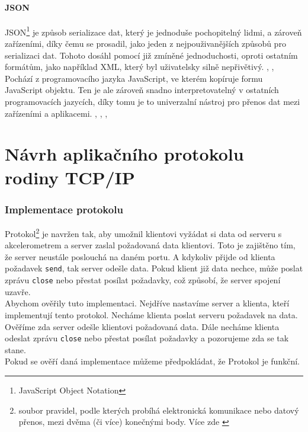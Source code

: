 \documentclass[12pt]{report}			%
\begin{document}
				\subsection{JSON}
				
				
JSON\footnote{JavaScript Object Notation} je způsob serializace dat, který je jednoduše pochopitelný lidmi, a zároveň zařízeními, díky čemu se prosadil, jako jeden z nejpouživanějších způsobů pro serializaci dat. Tohoto dosáhl pomocí již zmíněné jednoduchosti, oproti ostatním formátům, jako například XML, který byl uživatelsky silně nepřivětivý. \cite{JSON1}, \cite{JSON2}, \cite{JSON3}
\\
Pochází z programovacího jazyka JavaScript, ve kterém kopíruje formu JavaScript objektu. Ten je ale zároveň snadno interpretovatelný v ostatních programovacích jazycích, díky tomu je to univerzalní nástroj pro přenos dat mezi zařízeními a aplikacemi. \cite{JSON1}, \cite{JSON2}, \cite{JSON3}, \cite{JSON4}


			

	\part{Návrh aplikačního protokolu rodiny TCP/IP}



\section{Implementace protokolu}
Protokol\footnote{soubor pravidel, podle kterých probíhá elektronická komunikace nebo datový přenos, mezi dvěma (či více) konečnými body. Více zde \cite{slovnik}} 
je navržen tak, aby umožnil klientovi vyžádat si data od serveru s akcelerometrem a server zaslal požadovaná data klientovi. Toto je zajištěno tím, že server neustále poslouchá na daném portu. A kdykoliv přijde od klienta požadavek \texttt{send}, tak server odešle data. Pokud klient již data nechce, může poslat zprávu \texttt{close} nebo přestat posílat požadavky, což způsobí, že server spojení uzavře.
\\
Abychom ověřily tuto implementaci. Nejdříve nastavíme server a klienta, kteří implementují tento protokol. Necháme klienta poslat serveru požadavek na data. Ověříme zda server odešle klientovi požadovaná data. Dále necháme klienta odeslat zprávu \texttt{close} nebo přestat posílat požadavky a pozorujeme zda se tak stane.
\\
Pokud se ověří daná implementace můžeme předpokládat, že Protokol je funkční.
\\
\end{document}

